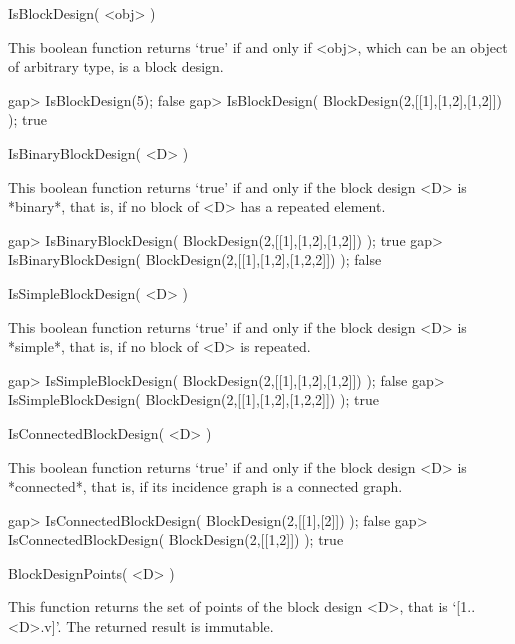%
%
%
%
\def\DESIGN{\sf DESIGN}
\def\GRAPE{\sf GRAPE}
\def\nauty{\it nauty}
\def\Aut{{\rm Aut}\,}
\def\x{\times}


\>IsBlockDesign( <obj> )

This boolean function  returns `true' if and only if <obj>, which can be
an object of arbitrary type, is a block design.

\beginexample
gap> IsBlockDesign(5);
false
gap> IsBlockDesign( BlockDesign(2,[[1],[1,2],[1,2]]) );
true
\endexample



\>IsBinaryBlockDesign( <D> )

This boolean function  returns `true' if and only if the block design
<D> is *binary*, that is, if no block of <D> has a repeated element.

\beginexample
gap> IsBinaryBlockDesign( BlockDesign(2,[[1],[1,2],[1,2]]) );
true
gap> IsBinaryBlockDesign( BlockDesign(2,[[1],[1,2],[1,2,2]]) );
false
\endexample



\>IsSimpleBlockDesign( <D> )

This boolean function  returns `true' if and only if the block design
<D> is *simple*, that is, if no block of <D> is repeated.

\beginexample
gap> IsSimpleBlockDesign( BlockDesign(2,[[1],[1,2],[1,2]]) );  
false
gap> IsSimpleBlockDesign( BlockDesign(2,[[1],[1,2],[1,2,2]]) );
true
\endexample



\>IsConnectedBlockDesign( <D> )

This boolean function  returns `true' if and only if the block design
<D> is *connected*, that is, if its incidence graph is a connected
graph.

\beginexample
gap> IsConnectedBlockDesign( BlockDesign(2,[[1],[2]]) ); 
false
gap> IsConnectedBlockDesign( BlockDesign(2,[[1,2]]) );  
true
\endexample



\>BlockDesignPoints( <D> )

This function returns the set of points of the block design <D>, that is
`[1..<D>.v]'. The returned result is immutable.

